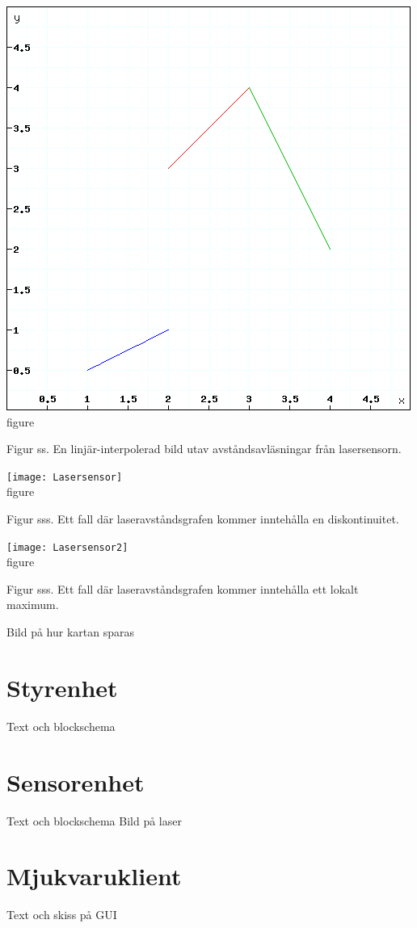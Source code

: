 \documentclass{article}
\begin{document}
\begin{center}
  \includegraphics[width=\textwidth,height=\textheight,keepaspectratio]{Laserfunktionskurva} \\
  \caption{figure}{Figur ss. En linjär-interpolerad bild utav avståndsavläsningar från lasersensorn.}
  \label{fig:picture}
\end{center}


\begin{center}
  \texttt{[image: Lasersensor]} \\
  \caption{figure}{Figur sss. Ett fall där laseravståndsgrafen kommer inntehålla en diskontinuitet.}
  \label{fig:picture}
\end{center}


\begin{center}
  \texttt{[image: Lasersensor2]} \\
  \caption{figure}{Figur sss. Ett fall där laseravståndsgrafen kommer inntehålla ett lokalt maximum.}
  \label{fig:picture}
\end{center}

Bild på hur kartan sparas

\section{Styrenhet}
Text och blockschema

\section{Sensorenhet}
Text och blockschema
Bild på laser

\section{Mjukvaruklient}
Text och skiss på GUI
\end{document}
